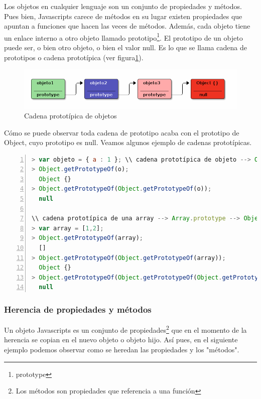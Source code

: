 Los objetos en cualquier lenguaje son un conjunto de propiedades y métodos. Pues bien, Javascripts carece de métodos en su lugar existen propiedades que apuntan a funciones que hacen las veces de métodos. Además, cada objeto tiene un enlace interno a otro objeto llamado prototipo\footnote{prototype}. El prototipo de un objeto puede ser, o bien otro objeto, o bien el valor null. Es lo que se llama cadena de prototipos o cadena prototípica (ver figura\ref{fig:cadena-prototipos}). 

\begin{figure}[tbph]
\centering
\includegraphics[width=0.7\linewidth]{imagenes/prototipo1}
\caption{Cadena prototípica de objetos}
\label{fig:cadena-prototipos}
\end{figure}

Cómo se puede observar toda cadena de prototipo acaba con el prototipo de Object, cuyo prototipo es null. Veamos algunos ejemplo de cadenas prototípicas. 

\begin{lstlisting}[language=JavaScript, numbers=left]
> var objeto = { a : 1 }; \\ cadena prototípica de objeto --> Object.prototype --> null
> Object.getPrototypeOf(o); 
  Object {}
> Object.getPrototypeOf(Object.getPrototypeOf(o));
  null

\\ cadena prototípica de una array --> Array.prototype --> Object.prototype --> null
> var array = [1,2];
> Object.getPrototypeOf(array);
  []
> Object.getPrototypeOf(Object.getPrototypeOf(array));
  Object {}
> Object.getPrototypeOf(Object.getPrototypeOf(Object.getPrototypeOf(array)));
  null
\end{lstlisting}


\subsubsection{Herencia de propiedades y métodos}

Un objeto Javascripts es un conjunto de propiedades\footnote{Los métodos son propiedades que referencia a una función} que en el momento de la herencia se copian en el nuevo objeto o objeto hijo. Así pues, en el siguiente ejemplo podemos observar como se heredan las propiedades y los "métodos". 

